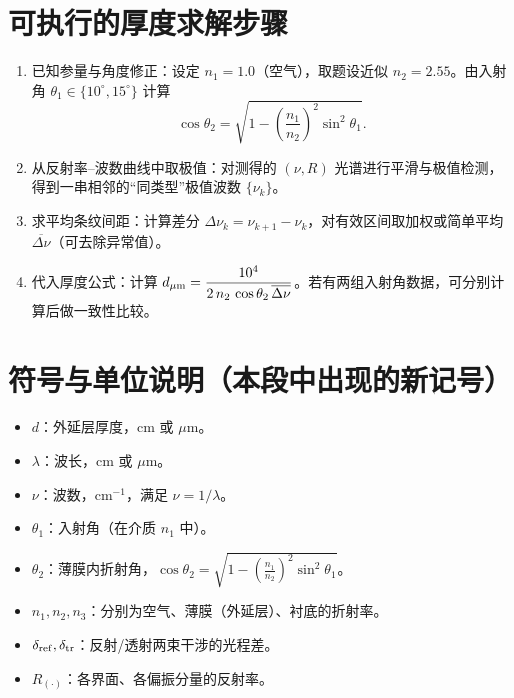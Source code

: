 \documentclass{ctexart}
\begin{document}
\section{可执行的厚度求解步骤}
\begin{enumerate}
    \item 已知参量与角度修正：设定 \(n_1=1.0\)（空气），取题设近似 \(n_2=2.55\)。由入射角 \(\theta_1 \in \{10^\circ, 15^\circ\}\) 计算
          \[
              \cos\theta_2=\sqrt{1-\left(\frac{n_1}{n_2}\right)^2\sin^2\theta_1}.
          \]
    \item 从反射率–波数曲线中取极值：对测得的 \((\nu, R)\) 光谱进行平滑与极值检测，得到一串相邻的“同类型”极值波数 \(\{\nu_k\}\)。
    \item 求平均条纹间距：计算差分 \(\Delta \nu_k=\nu_{k+1}-\nu_k\)，对有效区间取加权或简单平均 \(\overline{\Delta\nu}\)（可去除异常值）。
    \item 代入厚度公式：计算 \(d_{\mu{\rm m}}=\dfrac{10^4}{2\,n_2\,\cos\theta_2\,\overline{\Delta\nu}}\)。若有两组入射角数据，可分别计算后做一致性比较。
\end{enumerate}

\section{符号与单位说明（本段中出现的新记号）}
\begin{itemize}
    \item \(d\)：外延层厚度，cm 或 \(\mu\)m。
    \item \(\lambda\)：波长，cm 或 \(\mu\)m。
    \item \(\nu\)：波数，cm\(^{-1}\)，满足 \(\nu=1/\lambda\)。
    \item \(\theta_1\)：入射角（在介质 \(n_1\) 中）。
    \item \(\theta_2\)：薄膜内折射角，\(\cos\theta_2=\sqrt{1-(\tfrac{n_1}{n_2})^2\sin^2\theta_1}\)。
    \item \(n_1,n_2,n_3\)：分别为空气、薄膜（外延层）、衬底的折射率。
    \item \(\delta_{\rm ref},\delta_{\rm tr}\)：反射/透射两束干涉的光程差。
    \item \(R_{(\cdot)}\)：各界面、各偏振分量的反射率。
\end{itemize}
\end{document}
